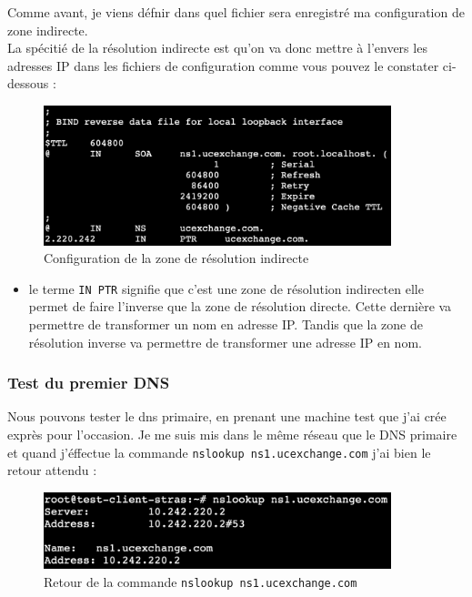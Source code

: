 \documentclass[12pt, a4paper]{article}
\begin{document}
    Comme avant, je viens défnir dans quel fichier sera enregistré ma
    configuration de zone indirecte.\\
    
    La spécitié de la résolution indirecte
    est qu'on va donc mettre à l'envers les adresses IP dans les fichiers 
    de configuration comme vous pouvez le constater ci-dessous : 

    \begin{figure}[h]
		\centering
		\includegraphics[width=0.9\textwidth]{img/ns1-inv.png}
		\caption{Configuration de la zone de résolution indirecte}
		\label{fig:ns1-inv}
	\end{figure}

    \begin{itemize}
        \item le terme \texttt{IN PTR} signifie que c'est une zone de résolution indirecten elle permet de faire l'inverse que la zone de résolution directe. Cette dernière va permettre de transformer un nom en adresse IP. Tandis que la zone de résolution inverse va permettre de transformer une adresse IP en nom. 
    \end{itemize}

    \newpage
    \subsubsection{Test du premier DNS}

    Nous pouvons tester le dns primaire, en prenant une machine test que j'ai 
    crée exprès pour l'occasion. Je me suis mis dans le même réseau que le DNS 
    primaire et quand j'éffectue la commande \texttt{nslookup ns1.ucexchange.com}
    j'ai bien le retour attendu : 

    \begin{figure}[h]
		\centering
		\includegraphics[width=0.9\textwidth]{img/ns-ns1.png}
		\caption{Retour de la commande \texttt{nslookup ns1.ucexchange.com}}
		\label{fig:ns1-ns}
	\end{figure}
\end{document}

